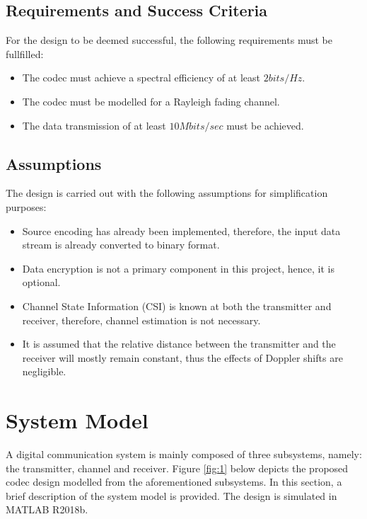 \documentclass[pdftex,11pt,a4paper]{article}
\begin{document}
\subsection{Requirements and Success Criteria}
For the design to be deemed successful, the following requirements must be fullfilled:

\begin{itemize}
    \item The codec must achieve a spectral efficiency of at least $2bits/Hz$.
    \item The codec must be modelled for a Rayleigh fading channel.
    \item The data transmission of at least $10Mbits/sec$ must be achieved. 
\end{itemize}{}

\subsection{Assumptions}
The design is carried out with the following assumptions for simplification purposes:

\begin{itemize}
    \item Source encoding has already been implemented, therefore, the input data stream is already converted to binary format.
    \item Data encryption is not a primary component in this project, hence, it is optional.
    \item Channel State Information (CSI) is known at both the transmitter and receiver, therefore, channel estimation is not necessary.
    \item It is assumed that the relative distance between the transmitter and the receiver will mostly remain constant, thus the effects of Doppler shifts are negligible. 
\end{itemize}{}

\section{System Model}
A digital communication system  is mainly composed of three subsystems, namely: the transmitter, channel and receiver. Figure \ref{fig:1} below depicts the proposed codec design modelled from the aforementioned subsystems. In this section, a brief description of the system model is provided. The design is simulated in MATLAB R2018b.
\end{document}
